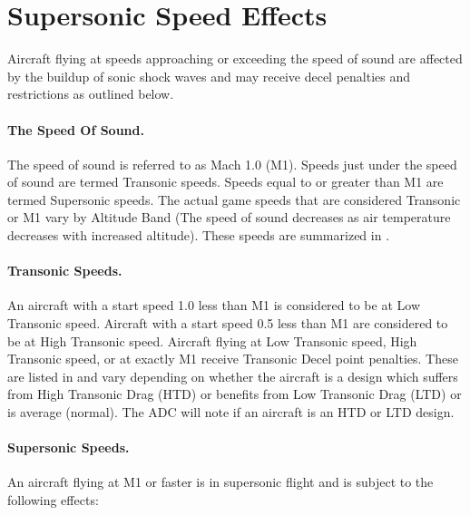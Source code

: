 \section{Supersonic Speed Effects}


Aircraft flying at speeds approaching or exceeding the speed of sound are affected by the buildup of sonic shock waves and may receive decel penalties and restrictions as outlined below.

\paragraph{The Speed Of Sound.} The speed of sound is referred to as Mach 1.0 (M1). Speeds just under the speed of sound are termed Transonic speeds. Speeds equal to or greater than M1 are termed Supersonic speeds. The actual game speeds that are considered Transonic or M1 vary by Altitude Band (The speed of sound decreases as air temperature decreases with increased altitude). These speeds are summarized in .

\paragraph{Transonic Speeds.} An aircraft with a start speed 1.0 less than M1 is considered to be at Low Transonic speed. Aircraft with a start speed 0.5 less than M1 are considered to be at High Transonic speed. Aircraft flying at Low Transonic speed, High Transonic speed, or at exactly M1 receive Transonic Decel point penalties. These are listed in  and vary depending on whether the aircraft is a design which suffers from High Transonic Drag (HTD) or benefits from Low Transonic Drag (LTD) or is average (normal). The ADC will note if an aircraft is an HTD or LTD design.


\paragraph{Supersonic Speeds.} An aircraft flying at M1 or faster is in supersonic flight and is subject to the following effects:

